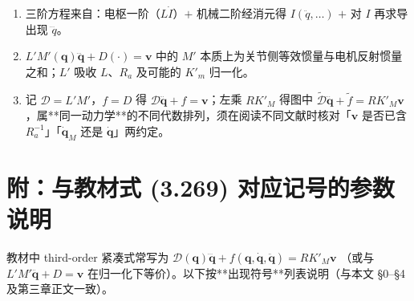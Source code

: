 \documentclass[UTF8,a4paper,12pt]{ctexart}
\begin{document}
\begin{enumerate}
\item 三阶方程来自：电枢一阶（$L\dot I$）$+$ 机械二阶经消元得 $I(\ddot q,\ldots)$ $+$ 对 $I$ 再求导出现 $\dddot q$。
\item $L'M'(\bm{q})\dddot{\bm{q}}+D(\cdot)=\bm{v}$ 中的 $M'$ 本质上为关节侧等效惯量与电机反射惯量之和；$L'$ 吸收 $L$、$R_a$ 及可能的 $K'_m$ 归一化。
\item 记 $\mathcal{D}=L'M'$，$f=D$ 得 $\mathcal{D}\dddot{\bm{q}}+f=\bm{v}$；左乘 $RK'_M$ 得图中 $\widetilde{\mathcal{D}}\dddot{\bm{q}}+\tilde f=RK'_M\bm{v}$，属**同一动力学**的不同代数排列，须在阅读不同文献时核对「$\bm{v}$ 是否已含 $R_a^{-1}$」「$\dot{\bm{q}}_M$ 还是 $\dot{\bm{q}}$」两约定。
\end{enumerate}

\section*{附：与教材式 \texorpdfstring{(3.269)}{(3.269)} 对应记号的参数说明}

教材中 third-order 紧凑式常写为
$\mathcal{D}(\bm{q})\dddot{\bm{q}}+f(\bm{q},\dot{\bm{q}},\ddot{\bm{q}})=R K'_M \bm{v}$
（或与 $L' M' \dddot{\bm{q}}+D=\bm{v}$ 在归一化下等价）。以下按**出现符号**列表说明（与本文 \S0--\S4 及第三章正文一致）。
\end{document}
